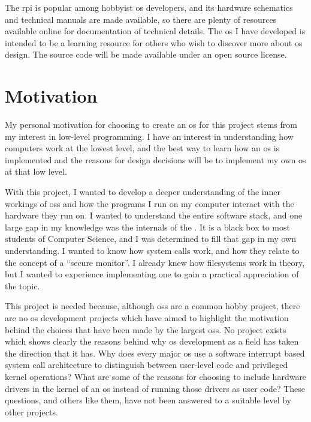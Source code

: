 \documentclass{article}
\begin{document}
The \gls{rpi} is popular among hobbyist \gls{os} developers, and its hardware
schematics and technical manuals are made available, so there are plenty of
resources available online for documentation of technical details. The \gls{os}
I have developed is intended to be a learning resource for others who wish to
discover more about \gls{os} design. The source code will be made available
under an open source license.

\section{Motivation}
My personal motivation for choosing to create an \gls{os} for this project
stems from my interest in low-level programming. I have an interest in
understanding how computers work at the lowest level, and the best way to learn
how an \gls{os} is implemented and the reasons for design decisions will be to
implement my own \gls{os} at that low level.

With this project, I wanted to develop a deeper understanding of the inner
workings of \glspl{os} and how the programs I run on my computer interact with
the hardware they run on. I wanted to understand the entire software stack, and
one large gap in my knowledge was the internals of the . It is a
black box to most students of Computer Science, and I was determined to fill
that gap in my own understanding. I wanted to know how system calls work, and
how they relate to the concept of a ``secure monitor''. I already knew how
filesystems work in theory, but I wanted to experience implementing one to gain
a practical appreciation of the topic.

This project is needed because, although \glspl{os} are a common hobby project,
there are no \gls{os} development projects which have aimed to highlight the
motivation behind the choices that have been made by the largest \glspl{os}. No
project exists which shows clearly the reasons behind why \gls{os} development
as a field has taken the direction that it has. Why does every major \gls{os}
use a software interrupt based system call architecture to distinguish between
user-level code and privileged kernel operations? What are some of the reasons
for choosing to include hardware drivers in the kernel of an \gls{os} instead
of running those drivers as user code? These questions, and others like them,
have not been answered to a suitable level by other projects.
\end{document}
